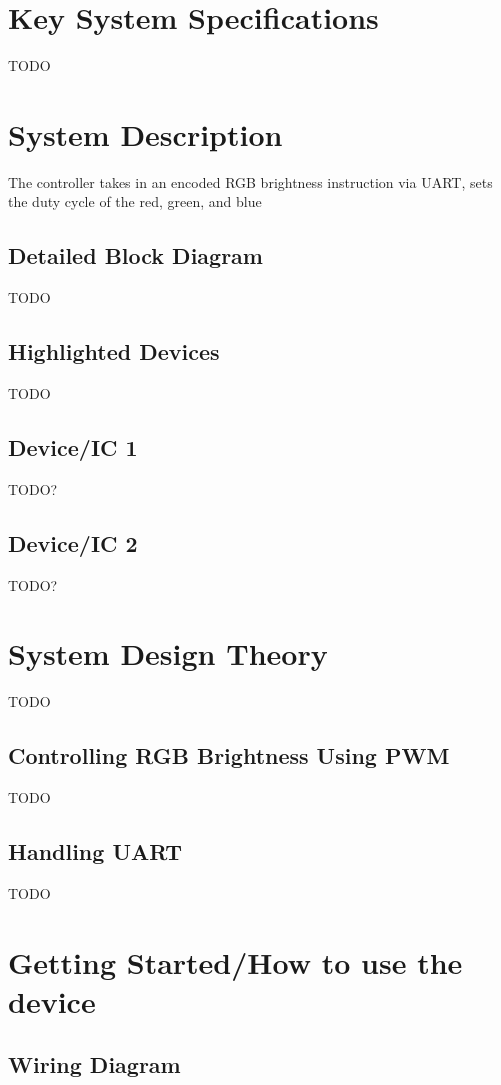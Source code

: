 \documentclass{hitec}
\begin{document}
\section{Key System Specifications}
TODO

\section{System Description}
The controller takes in an encoded RGB brightness instruction via UART, sets the duty cycle of the red, green, and blue 

\subsection{Detailed Block Diagram}
TODO

\subsection{Highlighted Devices}
TODO

\subsection{Device/IC 1}
TODO?

\subsection{Device/IC 2}
TODO?

\section{System Design Theory}
TODO

\subsection{Controlling RGB Brightness Using PWM}
TODO

\subsection{Handling UART}
TODO

\section{Getting Started/How to use the device}

\subsection{Wiring Diagram}
\end{document}
